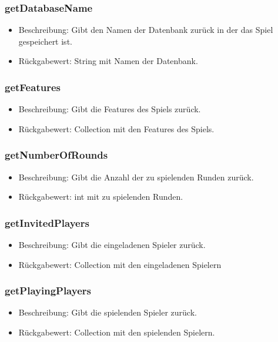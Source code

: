 \documentclass[a4paper]{scrreprt}
\begin{document}
	\subsubsection{getDatabaseName}
	\begin{itemize}
		\item Beschreibung: Gibt den Namen der Datenbank zurück in der das Spiel gespeichert ist.
		\item Rückgabewert: String mit Namen der Datenbank.
	\end{itemize}
	
	\subsubsection{getFeatures}
	\begin{itemize}
		\item Beschreibung: Gibt die Features des Spiels zurück.
		\item Rückgabewert: Collection mit den Features des Spiels.
	\end{itemize}
	
	\subsubsection{getNumberOfRounds}
	\begin{itemize}
		\item Beschreibung: Gibt die Anzahl der zu spielenden Runden zurück.
		\item Rückgabewert: int mit zu spielenden Runden.
	\end{itemize}
	
	\subsubsection{getInvitedPlayers}
	\begin{itemize}
		\item Beschreibung: Gibt die eingeladenen Spieler zurück.
		\item Rückgabewert: Collection mit den eingeladenen Spielern
	\end{itemize}
	
	\subsubsection{getPlayingPlayers}
	\begin{itemize}
		\item Beschreibung: Gibt die spielenden Spieler zurück.
		\item Rückgabewert: Collection mit den spielenden Spielern.
	\end{itemize}
	
\end{document}
